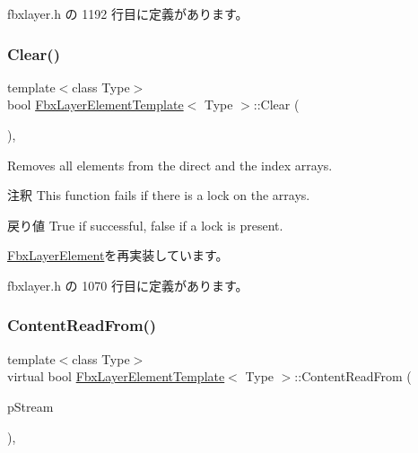  fbxlayer.\+h の 1192 行目に定義があります。

\mbox{\label{class_fbx_layer_element_template_abe029dd81aa956b415b9534aa3536bf0}} 
\subsubsection{\texorpdfstring{Clear()}{Clear()}}
{\footnotesize\ttfamily template$<$class Type$>$ \\
bool \hyperlink{class_fbx_layer_element_template}{Fbx\+Layer\+Element\+Template}$<$ Type $>$\+::Clear (\begin{DoxyParamCaption}{ }\end{DoxyParamCaption})\hspace{0.3cm}{\ttfamily [inline]}, {\ttfamily [virtual]}}

Removes all elements from the direct and the index arrays. \begin{DoxyRemark}{注釈}
This function fails if there is a lock on the arrays. 
\end{DoxyRemark}
\begin{DoxyReturn}{戻り値}
{\ttfamily True} if successful, {\ttfamily false} if a lock is present. 
\end{DoxyReturn}


\hyperlink{class_fbx_layer_element_a6ab41d0a26802a359efbbc3b2b12dd3d}{Fbx\+Layer\+Element}を再実装しています。



 fbxlayer.\+h の 1070 行目に定義があります。

\mbox{\label{class_fbx_layer_element_template_a19424f43272601bf018b8a0ba843b094}} 
\subsubsection{\texorpdfstring{Content\+Read\+From()}{ContentReadFrom()}}
{\footnotesize\ttfamily template$<$class Type$>$ \\
virtual bool \hyperlink{class_fbx_layer_element_template}{Fbx\+Layer\+Element\+Template}$<$ Type $>$\+::Content\+Read\+From (\begin{DoxyParamCaption}\item[{const \hyperlink{class_fbx_stream}{Fbx\+Stream} \&}]{p\+Stream }\end{DoxyParamCaption})\hspace{0.3cm}{\ttfamily [inline]}, {\ttfamily [virtual]}}



